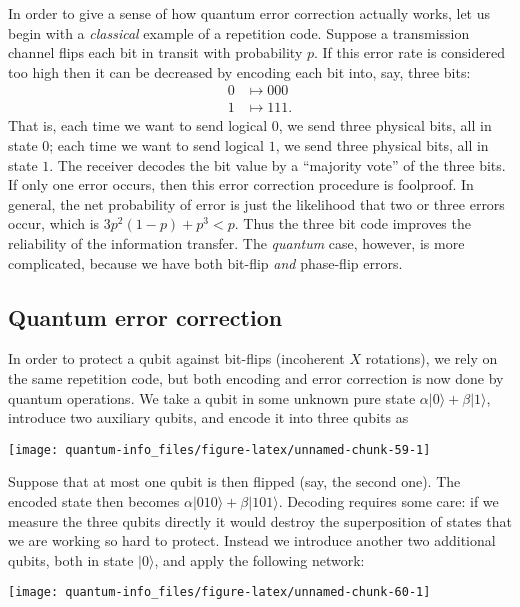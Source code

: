\documentclass[fleqn]{article}
\begin{document}
In order to give a sense of how quantum error correction actually works, let us begin with a \emph{classical} example of a repetition code.
Suppose a transmission channel flips each bit in transit with probability \(p\).
If this error rate is considered too high then it can be decreased by encoding each bit into, say, three bits:
\[
  \begin{aligned}
    0 &\mapsto 000
  \\1 &\mapsto 111.
  \end{aligned}
\]
That is, each time we want to send logical \(0\), we send three physical bits, all in state \(0\); each time we want to send logical \(1\), we send three physical bits, all in state \(1\).
The receiver decodes the bit value by a ``majority vote'' of the three bits.
If only one error occurs, then this error correction procedure is foolproof.
In general, the net probability of error is just the likelihood that two or three errors occur, which is \(3p^2(1-p) + p^3 < p\).
Thus the three bit code improves the reliability of the information transfer.
The \emph{quantum} case, however, is more complicated, because we have both bit-flip \emph{and} phase-flip errors.

\hypertarget{quantum-error-correction}{%
\subsection{Quantum error correction}\label{quantum-error-correction}}

In order to protect a qubit against bit-flips (incoherent \(X\) rotations), we rely on the same repetition code, but both encoding and error correction is now done by quantum operations.
We take a qubit in some unknown pure state \(\alpha|0\rangle + \beta|1\rangle\), introduce two auxiliary qubits, and encode it into three qubits as

\begin{center}\texttt{[image: quantum-info\_files/figure-latex/unnamed-chunk-59-1]} \end{center}

Suppose that at most one qubit is then flipped (say, the second one).
The encoded state then becomes \(\alpha|010\rangle + \beta|101\rangle\).
Decoding requires some care: if we measure the three qubits directly it would destroy the superposition of states that we are working so hard to protect.
Instead we introduce another two additional qubits, both in state \(|0\rangle\), and apply the following network:

\begin{center}\texttt{[image: quantum-info\_files/figure-latex/unnamed-chunk-60-1]} \end{center}
\end{document}
